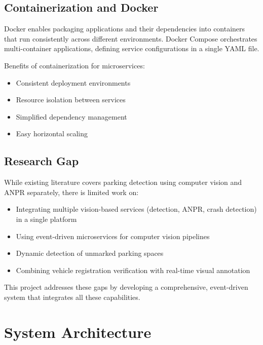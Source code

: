 \documentclass[12pt,a4paper]{report}
\begin{document}
\section{Containerization and Docker}

Docker \cite{b4} enables packaging applications and their dependencies into containers that run consistently across different environments. Docker Compose orchestrates multi-container applications, defining service configurations in a single YAML file.

Benefits of containerization for microservices:

\begin{itemize}
    \item Consistent deployment environments
    \item Resource isolation between services
    \item Simplified dependency management
    \item Easy horizontal scaling
\end{itemize}

\section{Research Gap}

While existing literature covers parking detection using computer vision and ANPR separately, there is limited work on:

\begin{itemize}
    \item Integrating multiple vision-based services (detection, ANPR, crash detection) in a single platform
    \item Using event-driven microservices for computer vision pipelines
    \item Dynamic detection of unmarked parking spaces
    \item Combining vehicle registration verification with real-time visual annotation
\end{itemize}

This project addresses these gaps by developing a comprehensive, event-driven system that integrates all these capabilities.


\chapter{System Architecture}
\end{document}
